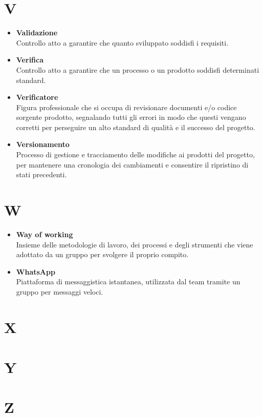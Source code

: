 \documentclass[a4paper,12pt]{article}
\begin{document}
        \section*{V} {
            \begin{itemize}
                \item \textbf{Validazione}\\
                    Controllo atto a garantire che quanto sviluppato soddisfi i requisiti.
                \item \textbf{Verifica}\\
                    Controllo atto a garantire che un processo o un prodotto soddisfi determinati standard.
                \item \textbf{Verificatore}\\
                    Figura professionale che si occupa di revisionare documenti e/o codice sorgente prodotto, segnalando tutti gli errori in modo che questi vengano corretti per perseguire un alto standard di qualità e il successo del progetto.
                \item \textbf{Versionamento}\\
                    Processo di gestione e tracciamento delle modifiche ai prodotti del progetto, per mantenere una cronologia dei cambiamenti e consentire il ripristino di stati precedenti.
            \end{itemize}
        }
        \newpage

        \section*{W} {
            \begin{itemize}
                \item \textbf{Way of working}\\
                    Insieme delle metodologie di lavoro, dei processi e degli strumenti che viene adottato da un gruppo per svolgere il proprio compito.
                \item \textbf{WhatsApp}\\
                    Piattaforma di messaggistica istantanea, utilizzata dal team tramite un gruppo per messaggi veloci.
            \end{itemize}
        }
        \newpage

        \section*{X} {
            
        }
        \newpage

        \section*{Y} {
            
        }
        \newpage

        \section*{Z} {
            
        }
\end{document}
